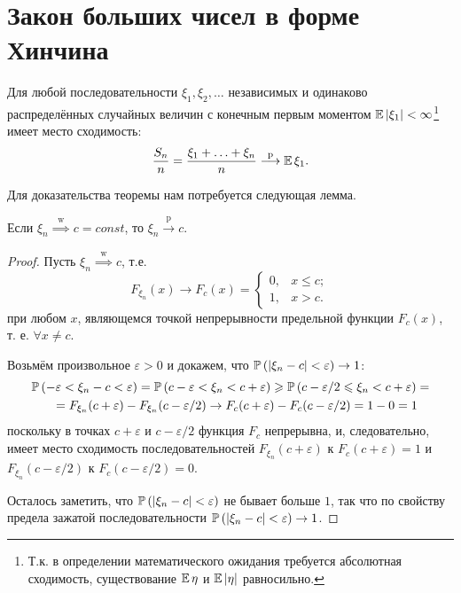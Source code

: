 \section{Закон больших чисел в форме Хинчина}
\begin{namedthm} \leavevmode

    Для любой последовательности $\xi_{1}, \xi_{2}, \ldots$ независимых и одинаково распределённых 
    случайных величин с конечным первым моментом $\operatorname{\mathbb{E}}\left|\xi_{1}\right|<\infty$\footnote{Т.к. в определении математического ожидания требуется абсолютная сходимость, существование $\operatorname{\mathbb{E}} \eta$ и $\operatorname{\mathbb{E}} \left| \eta \right|$ равносильно.} имеет место сходимость:
    \begin{equation*}
        \frac{S_{n}}{n} = \frac{\xi_{1}+\ldots+\xi_{n}}{n} %
        \stackrel{\text{p}}{\longrightarrow} \Exp \xi_1.
    \end{equation*}
\end{namedthm}
Для доказательства теоремы нам потребуется следующая лемма.
\begin{lem}
    Если $\xi_{n} \overset{\text{w}}{\implies} c=const$, то $\xi_{n} \xrightarrow[]{\text{p}} c$.
\end{lem}
\begin{proof}
    Пусть $\xi_{n} \overset{\text{w}}{\implies} c$, т.е.
    \begin{equation*}
        F_{\xi_{n}}(x) \to F_{c}(x) =
        \begin{cases}
            0, & x \leqslant c; \\
            1, & x > c.
        \end{cases}
    \end{equation*}
    при любом $x$, являющемся точкой непрерывности предельной функции $F_{c}(x)$, т. е. $\forall x \neq c$.
    
    Возьмём произвольное $\varepsilon>0$ и докажем, что $\operatorname{\mathbb{P}}\left(\left|\xi_{n}-c\right|<\varepsilon\right) \to 1$:
    \begin{multline*}
        \operatorname{\mathbb{P}}\left(-\varepsilon<\xi_{n}-c<\varepsilon\right)=\operatorname{\mathbb{P}}\left(c-\varepsilon<\xi_{n}<c+\varepsilon\right) \geqslant \operatorname{\mathbb{P}}\left(c-\varepsilon / 2 \leqslant \xi_{n}<c+\varepsilon\right)= \\
        \quad=F_{\xi_{n}}(c+\varepsilon)-F_{\xi_{n}}(c-\varepsilon / 2) \to F_{c}(c+\varepsilon)-F_{c}(c-\varepsilon / 2)=1-0=1
    \end{multline*}
    поскольку в точках $c+\varepsilon$ и $c-\varepsilon / 2$ функция $F_{c}$ непрерывна, и, следовательно, 
    имеет место сходимость последовательностей $F_{\xi_{n}}(c+\varepsilon)$ к $F_{c}(c+\varepsilon)=1$ и $F_{\xi_{n}}(c-\varepsilon / 2)$ к $F_{c}(c-\varepsilon / 2)=0$.
    
    Осталось заметить, что $\operatorname{\mathbb{P}}\left(\left|\xi_{n}-c\right|<\varepsilon\right)$ не бывает больше $1$, так что по свойству предела зажатой последовательности $\operatorname{\mathbb{P}}\left(\left|\xi_{n}-c\right|<\varepsilon\right) \to 1$.
\end{proof}

